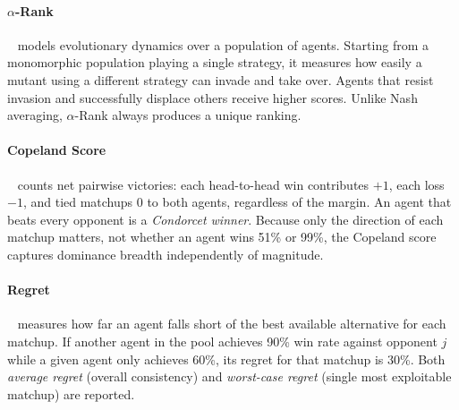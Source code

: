 \paragraph*{$\alpha$-Rank}~\cite{omidshafieiARankMultiAgentEvaluation2019} models evolutionary dynamics over a population of agents. Starting from a monomorphic population playing a single strategy, it measures how easily a mutant using a different strategy can invade and take over. Agents that resist invasion and successfully displace others receive higher scores. Unlike Nash averaging, $\alpha$-Rank always produces a unique ranking.

\paragraph*{Copeland Score}~\cite{saariCopelandMethodRelationships1996} counts net pairwise victories: each head-to-head win contributes $+1$, each loss $-1$, and tied matchups $0$ to both agents, regardless of the margin. An agent that beats every opponent is a \emph{Condorcet winner}. Because only the direction of each matchup matters, not whether an agent wins 51\% or 99\%, the Copeland score captures dominance breadth independently of magnitude.

\paragraph*{Regret}~\cite{savageTheoryStatisticalDecision1951} measures how far an agent falls short of the best available alternative for each matchup. If another agent in the pool achieves 90\% win rate against opponent $j$ while a given agent only achieves 60\%, its regret for that matchup is 30\%. Both \emph{average regret} (overall consistency) and \emph{worst-case regret} (single most exploitable matchup) are reported.